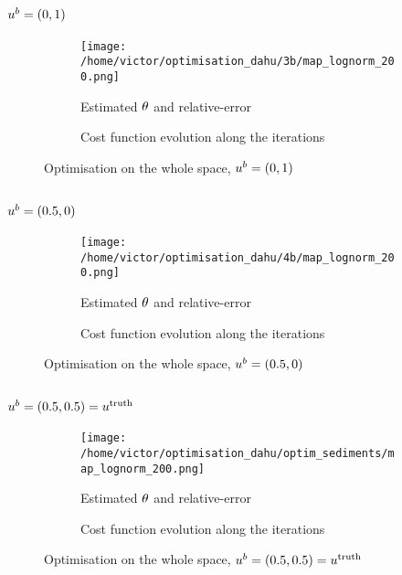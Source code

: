 \documentclass[../../Main_ManuscritThese.tex]{subfiles}
\begin{document}
\subsection*{$u^b=(0, 1)$}
\begin{figure}[ht]
  \begin{subfigure}{\textwidth}
  \centering
  \texttt{[image: /home/victor/optimisation\_dahu/3b/map\_lognorm\_200.png]}
  \caption{Estimated $\theta$ and relative-error}
\end{subfigure}
\begin{subfigure}{\textwidth}
  \centering
  \resizebox{1\textwidth}{!}{}
    \caption{Cost function evolution along the iterations}
\end{subfigure}
\caption{Optimisation on the whole space, $u^b=(0, 1)$}
\end{figure}
\clearpage
\subsection*{$u^b=(0.5, 0)$}
\begin{figure}[ht]
  \begin{subfigure}{\textwidth}
  \centering
  \texttt{[image: /home/victor/optimisation\_dahu/4b/map\_lognorm\_200.png]}
  \caption{Estimated $\theta$ and relative-error}
\end{subfigure}
\begin{subfigure}{\textwidth}
  \centering
  \resizebox{1\textwidth}{!}{}
    \caption{Cost function evolution along the iterations}
\end{subfigure}
\caption{Optimisation on the whole space, $u^b=(0.5, 0)$}
\end{figure}
\clearpage
\subsection*{$u^b=(0.5, 0.5) = u^{\mathrm{truth}}$}
\label{sec:appendix_truth_optim}
\begin{figure}[ht]
  \begin{subfigure}{\textwidth}
  \centering
  \texttt{[image: /home/victor/optimisation\_dahu/optim\_sediments/map\_lognorm\_200.png]}
  \caption{Estimated $\theta$ and relative-error}
\end{subfigure}
\begin{subfigure}{\textwidth}
  \centering
  \resizebox{1\textwidth}{!}{}
    \caption{Cost function evolution along the iterations}
  \end{subfigure}
  \caption{Optimisation on the whole space, $u^b=(0.5, 0.5) = u^{\mathrm{truth}}$}
\end{figure}
\clearpage
\end{document}
